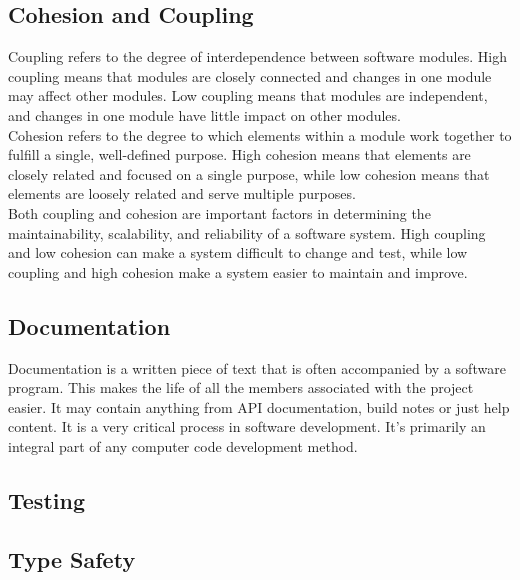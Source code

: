 \subsection{Cohesion and Coupling}

Coupling refers to the degree of interdependence between software modules. High coupling means that modules are closely connected and changes in one module may affect other modules. Low coupling means that modules are independent, and changes in one module have little impact on other modules. \cite{geeksforgeeks:c&c} \\

Cohesion refers to the degree to which elements within a module work together to fulfill a single, well-defined purpose. High cohesion means that elements are closely related and focused on a single purpose, while low cohesion means that elements are loosely related and serve multiple purposes. \cite{geeksforgeeks:c&c} \\

Both coupling and cohesion are important factors in determining the maintainability, scalability, and reliability of a software system. High coupling and low cohesion can make a system difficult to change and test, while low coupling and high cohesion make a system easier to maintain and improve. \cite{geeksforgeeks:c&c} 

\subsection{Documentation}

Documentation is a written piece of text that is often accompanied by a software program. This makes the life of all the members associated with the project easier. It may contain anything from API documentation, build notes or just help content. It is a very critical process in software development. It’s primarily an integral part of any computer code development method. \cite{geeksforgeeks:doc} \\

\subsection{Testing}

\subsection{Type Safety}